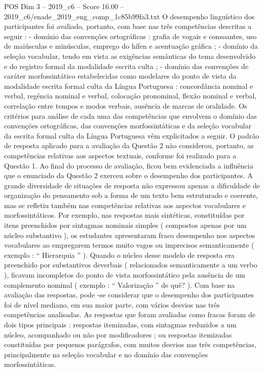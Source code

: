 \begin{textsample}{POS Dim 3 – 2019\_c6 – Score 16.00 – 2019\_c6/enade\_2019\_eng\_comp\_1c85b99fa3.txt}
O desempenho linguístico dos participantes foi avaliado, portanto, com base nas três competências descritas a seguir : - domínio das convenções ortográficas : grafia de vogais e consoantes, uso de maiúsculas e minúsculas, emprego do hífen e acentuação gráfica ; - domínio da seleção vocabular, tendo em vista as exigências semânticas do tema desenvolvido e do registro formal da modalidade escrita culta ; - domínio das convenções de caráter morfossintático estabelecidas como modelares do ponto de vista da modalidade escrita formal culta da Língua Portuguesa : concordância nominal e verbal, regência nominal e verbal, colocação pronominal, flexão nominal e verbal, correlação entre tempos e modos verbais, ausência de marcas de oralidade.
Os critérios para análise de cada uma das competências que envolvem o domínio das convenções ortográficas, das convenções morfossintáticas e da seleção vocabular da escrita formal culta da Língua Portuguesa vêm explicitados a seguir.
O padrão de resposta aplicado para a avaliação da Questão 2 não considerou, portanto, as competências relativas aos aspectos textuais, conforme foi realizado para a Questão 1.
Ao final do processo de avaliação, ficou bem evidenciada a influência que o enunciado da Questão 2 exerceu sobre o desempenho dos participantes.
A grande diversidade de situações de resposta não expressou apenas a dificuldade de organização do pensamento sob a forma de um texto bem estruturado e coerente, mas se refletiu também nas competências relativas aos aspectos vocabulares e morfossintáticos.
Por exemplo, nas respostas mais sintéticas, constituídas por itens preenchidos por sintagmas nominais simples ( compostos apenas por um núcleo substantivo ), os estudantes apresentaram fraco desempenho nos aspectos vocabulares ao empregarem termos muito vagos ou imprecisos semanticamente ( exemplo : “ Hierarquia ” ).
Quando o núcleo desse modelo de resposta era preenchido por substantivos deverbais ( relacionados semanticamente a um verbo ), ficavam incompletos do ponto de vista morfossintático pela ausência de um complemento nominal ( exemplo : “ Valorização ” de quê? ).
Com base na avaliação das respostas, pode -se considerar que o desempenho dos participantes foi de nível mediano, em sua maior parte, com vários desvios nas três competências analisadas.
As respostas que foram avaliadas como fracas foram de dois tipos principais : respostas itemizadas, com sintagmas reduzidos a um núcleo, acompanhado ou não por modificadores ; ou respostas itemizadas constituídas por pequenos parágrafos, com muitos desvios nas três competências, principalmente na seleção vocabular e no domínio das convenções morfossintáticas.

\end{textsample}
